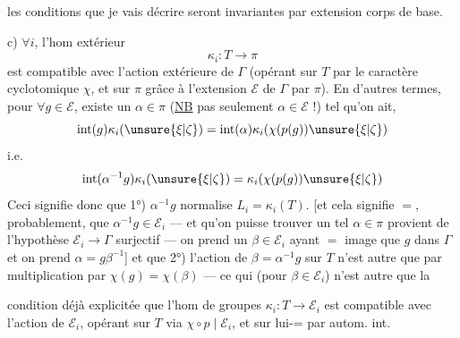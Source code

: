 
les conditions que je vais décrire seront invariantes par extension  corps de base.


c) \(\forall i\), l'hom extérieur
\[
\kappa_i:T\longrightarrow\pi
\]
est compatible avec l'action extérieure de \(\Gamma\) (opérant sur \(T\) par le
caractère cyclotomique \(\chi\), et sur \(\pi\) grâce à l'extension \(\mathcal E\)
de \(\Gamma\) par \(\pi\)). En d'autres termes, pour \(\forall g\in\mathcal E\),
existe un \uline{\(\alpha\in\pi\)} (\uline{NB} pas seulement
\(\alpha\in\mathcal E\) !) tel qu'on ait,
\[
\operatorname{int}(g)\kappa_i(\unsure{\xi|\zeta})
=\operatorname{int}(\alpha)\kappa_i(\chi(p(g))\unsure{\xi|\zeta})
\]
i.e.
\[
\operatorname{int}(\alpha^{-1}g)\kappa_i(\unsure{\xi|\zeta})
=\kappa_i(\chi(p(g))\unsure{\xi|\zeta})
\]
Ceci signifie donc que 1°) \(\alpha^{-1}g\) normalise \(L_i=\kappa_i(T)\).
[et cela signifie \(=\), probablement, que \(\alpha^{-1}g\in\mathcal E_i\)
--- et qu'on puisse trouver un tel \(\alpha\in\pi\)
 provient de l'hypothèse
\(\mathcal E_i\to\Gamma\) surjectif --- on prend un \(\beta\in\mathcal E_i\)
 ayant \(=\) image que \(g\) dans \(\Gamma\)
et on prend \(\alpha=g\beta^{-1}\)] et que 2°) l'action  de
\(\beta=\alpha^{-1}g\) sur \(T\) n'est autre que par multiplication
par \(\chi(g)=\chi(\beta)\) --- ce qui (pour \(\beta\in\mathcal E_i\)) n'est autre que la



condition déjà explicitée que l'hom de groupes \(\kappa_i:T\to\mathcal E_i\)
est compatible avec l'action de \(\mathcal E_i\), opérant sur \(T\) via
\(\chi\circ p\mid\mathcal E_i\), et sur lui-= par autom. int.

